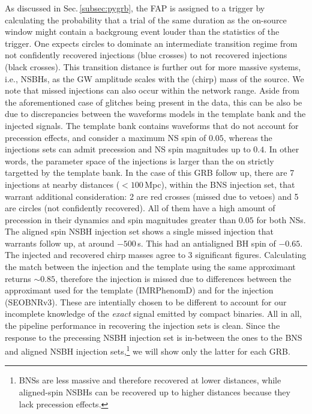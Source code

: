 \documentclass[binding=0.6cm, LaM]{sapthesis}
\begin{document}
	As discussed in Sec.\,\ref{subsec:pygrb}, the FAP is assigned to a trigger 
	by calculating the probability that a trial of the same duration as the on-source window 
	might contain a backgroung event louder than the statistics of the trigger.
        One expects circles to dominate an intermediate transition regime from 
	not confidently recovered injections (blue crosses) to not recovered injections (black crosses).
	This transition distance is further out for more massive systems, i.e., NSBHs, 
	as the GW amplitude scales with the (chirp) mass of the source. 
	We note that missed injections can also occur within the network range.
	Aside from the aforementioned case of glitches being present in the data, 
	this can be also be due to discrepancies between 
	the waveforms models in the template bank and the injected signals. 
	The template bank contains waveforms that do not account for precession effects, 
	and consider a maximum NS spin of $0.05$, whereas the injections sets can admit 
	precession and NS spin magnitudes up to $0.4$.
	In other words, the parameter space of the injections is larger 
	than the on strictly targetted by the template bank.
	In the case of this GRB follow up, there are 7 injections at nearby distances ($<100\,$Mpc), 
	within the BNS injection set, that warrant additional consideration: 
        2 are red crosses (missed due to vetoes) and 5 are circles (not confidently recovered).
	All of them have a high amount of precession in their dynamics and spin magnitudes greater than $0.05$ for both NSs.
	The aligned spin NSBH injection set shows a single missed injection that warrants follow up, 
	at around $-500\,$s.
	This had an antialigned BH spin of $-0.65$. 
	The injected and recovered chirp masses agree to 3 significant figures. 
	Calculating the match between the injection and the template using the same approximant returns $\sim 0.85$, 
	therefore the injection is missed due to differences between the approximant 
	used for the template (IMRPhenomD) and for the injection (SEOBNRv3).
	These are intentially chosen to be different to account for our incomplete knowledge 
	of the \emph{exact} signal emitted by compact binaries.
        All in all, the pipeline performance in recovering the injection sets is clean.
	Since the response to the precessing NSBH injection set is in-between the ones to the BNS and aligned NSBH injection sets,\footnote{BNSs are less massive and therefore recovered at lower distances, while aligned-spin NSBHs can be recovered up to higher distances because they lack precession effects.}
	we will show only the latter for each GRB.	
\end{document}
